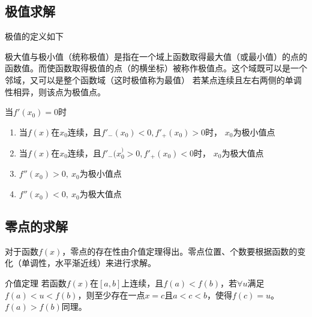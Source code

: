 \subsection{极值求解}
极值的定义如下
\begin{definition}
    极大值与极小值（统称极值）是指在一个域上函数取得最大值（或最小值）的点的函数值。而使函数取得极值的点（的横坐标）被称作极值点。这个域既可以是一个邻域，又可以是整个函数域（这时极值称为最值）
    若某点连续且左右两侧的单调性相异，则该点为极值点。
\end{definition}
\begin{theorem}
    当$f'(x_0)=0$时
    \begin{enumerate}
        \item 当$f(x)$在$x_0$连续，且$f'_-(x_0)<0,f'_+(x_0)>0$时， $x_0$为极小值点
        \item 当$f(x)$在$x_0$连续，且$f'_-(x_0^)>0,f'_+(x_0)<0$时， $x_0$为极大值点
        \item $f''(x_0)>0,\ x_0$为极小值点
        \item $f''(x_0)<0,\ x_0$为极大值点
    \end{enumerate}
\end{theorem}

\subsection{零点的求解}
对于函数$f(x)$，零点的存在性由介值定理得出。零点位置、个数要根据函数的变化（单调性，水平渐近线）来进行求解。
\begin{theorem}
    介值定理
    \label{th:介值定理}
    若函数$f(x)$在$[a,b]$上连续，且$f(a)<f(b)$，若$\forall u$满足$f(a)<u<f(b)$，则至少存在一点$x=c$且$a<c<b$，使得$f(c)=u$。$f(a)>f(b)$同理。
\end{theorem}

